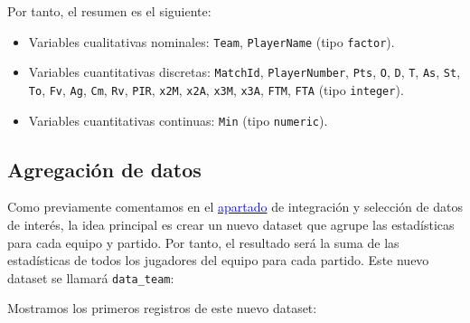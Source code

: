 \documentclass[
]{article}
\newenvironment{Shaded}{\begin{snugshade}}{\end{snugshade}}
\newcommand{\KeywordTok}[1]{\textcolor[rgb]{0.13,0.29,0.53}{\textbf{#1}}}
\newcommand{\NormalTok}[1]{#1}
\newcommand{\OperatorTok}[1]{\textcolor[rgb]{0.81,0.36,0.00}{\textbf{#1}}}
\newcommand{\OtherTok}[1]{\textcolor[rgb]{0.56,0.35,0.01}{#1}}
\newcommand{\StringTok}[1]{\textcolor[rgb]{0.31,0.60,0.02}{#1}}
\providecommand{\tightlist}{%
  \setlength{\itemsep}{0pt}\setlength{\parskip}{0pt}}
\begin{document}
Por tanto, el resumen es el siguiente:

\begin{itemize}
\tightlist
\item
  Variables cualitativas nominales: \texttt{Team}, \texttt{PlayerName}
  (tipo \texttt{factor}).
\item
  Variables cuantitativas discretas: \texttt{MatchId},
  \texttt{PlayerNumber}, \texttt{Pts}, \texttt{O}, \texttt{D},
  \texttt{T}, \texttt{As}, \texttt{St}, \texttt{To}, \texttt{Fv},
  \texttt{Ag}, \texttt{Cm}, \texttt{Rv}, \texttt{PIR}, \texttt{x2M},
  \texttt{x2A}, \texttt{x3M}, \texttt{x3A}, \texttt{FTM}, \texttt{FTA}
  (tipo \texttt{integer}).
\item
  Variables cuantitativas continuas: \texttt{Min} (tipo
  \texttt{numeric}).
\end{itemize}

\newpage

\hypertarget{agregaciuxf3n-de-datos}{%
\subsection{Agregación de datos}\label{agregaciuxf3n-de-datos}}

Como previamente comentamos en el
\protect\hyperlink{integraciuxf3n-y-selecciuxf3n-de-los-datos-de-interuxe9s-a-analizar}{\textcolor{blue}{apartado}}
de integración y selección de datos de interés, la idea principal es
crear un nuevo dataset que agrupe las estadísticas para cada equipo y
partido. Por tanto, el resultado será la suma de las estadísticas de
todos los jugadores del equipo para cada partido. Este nuevo dataset se
llamará \texttt{data\_team}:

\begin{Shaded}
\end{Shaded}

Mostramos los primeros registros de este nuevo dataset:
\end{document}
